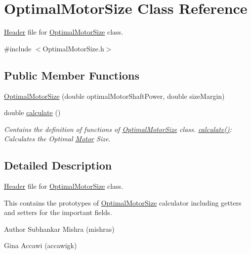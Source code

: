\hypertarget{class_optimal_motor_size}{}\section{Optimal\+Motor\+Size Class Reference}
\label{class_optimal_motor_size}


\hyperlink{class_header}{Header} file for \hyperlink{class_optimal_motor_size}{Optimal\+Motor\+Size} class.  




{\ttfamily \#include $<$Optimal\+Motor\+Size.\+h$>$}

\subsection*{Public Member Functions}
\begin{DoxyCompactItemize}
\item 
\hyperlink{class_optimal_motor_size_ad051dd00b8879fc4232536c936e98be1}{Optimal\+Motor\+Size} (double optimal\+Motor\+Shaft\+Power, double size\+Margin)
\item 
double \hyperlink{class_optimal_motor_size_aa9f4e68b9e1807d20e7738cd0789a539}{calculate} ()
\begin{DoxyCompactList}\small\item\em Contains the definition of functions of \hyperlink{class_optimal_motor_size}{Optimal\+Motor\+Size} class. \hyperlink{class_optimal_motor_size_aa9f4e68b9e1807d20e7738cd0789a539}{calculate()}\+: Calculates the Optimal \hyperlink{class_motor}{Motor} Size. \end{DoxyCompactList}\end{DoxyCompactItemize}


\subsection{Detailed Description}
\hyperlink{class_header}{Header} file for \hyperlink{class_optimal_motor_size}{Optimal\+Motor\+Size} class. 

This contains the prototypes of \hyperlink{class_optimal_motor_size}{Optimal\+Motor\+Size} calculator including getters and setters for the important fields.

\begin{DoxyAuthor}{Author}
Subhankar Mishra (mishras) 

Gina Accawi (accawigk) 
\end{DoxyAuthor}


